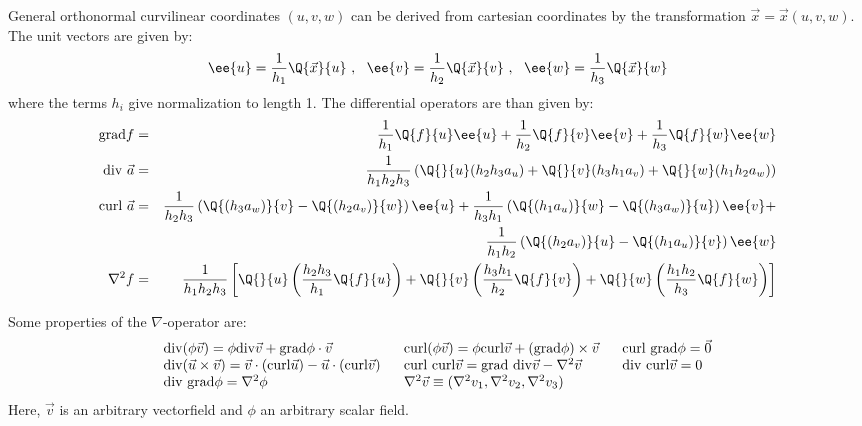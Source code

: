 General orthonormal curvilinear coordinates $(u,v,w)$ can be derived from
cartesian coordinates by the transformation $\vec{x}=\vec{x}(u,v,w)$. The unit
vectors are given by:
\[
\ee{u}=\frac{1}{h_1}\Q{\vec{x}}{u}~,~~ \ee{v}=\frac{1}{h_2}\Q{\vec{x}}{v}~,~~
\ee{w}=\frac{1}{h_3}\Q{\vec{x}}{w}
\]
where the terms $h_i$ give normalization to length 1. The differential operators
are than given by:
\begin{eqnarray*}
{\rm grad}f      &=&\frac{1}{h_1}\Q{f}{u}\ee{u}+\frac{1}{h_2}\Q{f}{v}\ee{v}+\frac{1}{h_3}\Q{f}{w}\ee{w}\\
{\rm div}~\vec{a}&=&\frac{1}{h_1h_2h_3}\left(\Q{}{u}(h_2h_3a_u)+\Q{}{v}(h_3h_1a_v)+\Q{}{w}(h_1h_2a_w)\right)\\
{\rm curl}~\vec{a}&=&\frac{1}{h_2h_3}\left(\Q{(h_3a_w)}{v}-\Q{(h_2a_v)}{w}\right)\ee{u}+
                    \frac{1}{h_3h_1}\left(\Q{(h_1a_u)}{w}-\Q{(h_3a_w)}{u}\right)\ee{v}+\\
                  &&\frac{1}{h_1h_2}\left(\Q{(h_2a_v)}{u}-\Q{(h_1a_u)}{v}\right)\ee{w}\\
\nabla^2 f       &=&\frac{1}{h_1h_2h_3}\left[\Q{}{u}\left(\frac{h_2h_3}{h_1}\Q{f}{u}\right)+
                    \Q{}{v}\left(\frac{h_3h_1}{h_2}\Q{f}{v}\right)+
                    \Q{}{w}\left(\frac{h_1h_2}{h_3}\Q{f}{w}\right)\right]
\end{eqnarray*}

Some properties of the $\nabla$-operator are:
\[
\begin{array}{l@{~~~~~}l@{~~~~~}l}
{\rm div}(\phi\vec{v})=\phi{\rm div}\vec{v}+{\rm grad}\phi\cdot\vec{v}&
{\rm curl}(\phi\vec{v})=\phi{\rm curl}\vec{v}+({\rm grad}\phi)\times\vec{v}&{\rm curl~grad}\phi=\vec{0}\\
{\rm div}(\vec{u}\times\vec{v})=\vec{v}\cdot({\rm curl}\vec{u})-\vec{u}\cdot({\rm curl}\vec{v})&
{\rm curl~curl}\vec{v}={\rm grad~div}\vec{v}-\nabla^2\vec{v}&{\rm div~curl}\vec{v}=0\\
{\rm div~grad}\phi=\nabla^2\phi&\nabla^2\vec{v}\equiv(\nabla^2v_1,\nabla^2v_2,\nabla^2v_3)
\end{array}
\]
Here, $\vec{v}$ is an arbitrary vectorfield and $\phi$ an arbitrary scalar
field.

